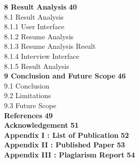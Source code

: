 \documentclass[12pt]{article}
\begin{document}
\noindent \textbf{8 \hspace{0.5em} Result Analysis} \hfill  \textbf{40} \\[6pt]
\hspace*{1cm} 8.1 Result Analysis  \\[6pt]
\hspace*{2cm} 8.1.1 User Interface  \\[6pt]
\hspace*{2cm} 8.1.2 Resume Analysis  \\[6pt]
\hspace*{2cm} 8.1.3 Resume Analysis Result  \\[6pt]
\hspace*{2cm} 8.1.4 Interview Interface  \\[6pt]
\hspace*{2cm} 8.1.5 Result Analysis  \\[10pt]
\noindent \textbf{9 \hspace{0.5em} Conclusion and Future Scope} \hfill  \textbf{46} \\[6pt]
\hspace*{1cm} 9.1 Conclusion  \\[6pt]
\hspace*{1cm} 9.2 Limitations  \\[6pt]
\hspace*{1cm} 9.3 Future Scope  \\[10pt]

\noindent \textbf{References} \hfill  \textbf{49} \\[6pt]
\textbf{Acknowledgement} \hfill  \textbf{51} \\[6pt]
\textbf{Appendix I : List of Publication} \hfill  \textbf{52} \\
\textbf{Appendix II : Published Paper} \hfill  \textbf{53} \\
\textbf{Appendix III : Plagiarism Report} \hfill  \textbf{54} \\

\newpage
{}
\setcounter{page}{1}
\end{document}
